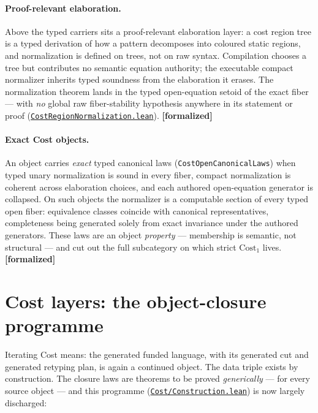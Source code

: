 \documentclass[11pt]{article}
\newcommand{\leanfile}[2]{\href{https://github.com/zariuq/MeTTapedia/blob/main/lean/mettapedia/Mettapedia/#1}{\code{#2}}}
\newcommand{\code}[1]{\texttt{#1}}
\newcommand{\formalized}{\textbf{[formalized]}}
\begin{document}
\paragraph{Proof-relevant elaboration.} Above the typed carriers sits a
proof-relevant elaboration layer: a cost region tree is a typed
derivation of how a pattern decomposes into coloured static regions, and
normalization is defined on trees, not on raw syntax.  Compilation
chooses a tree but contributes no semantic equation authority; the
executable compact normalizer inherits typed soundness from the
elaboration it erases.  The normalization theorem lands in the typed
open-equation setoid of the exact fiber --- with \emph{no} global raw
fiber-stability hypothesis anywhere in its statement or proof
(\leanfile{GSLT/LanguageDef/CostRegionNormalization.lean}{CostRegionNormalization.lean}).
\formalized

\paragraph{Exact Cost objects.} An object carries \emph{exact} typed
canonical laws (\code{CostOpenCanonicalLaws}) when typed unary
normalization is sound in every fiber, compact normalization is
coherent across elaboration choices, and each authored open-equation
generator is collapsed.  On such objects the normalizer is a computable
section of every typed open fiber: equivalence classes coincide with
canonical representatives, completeness being generated solely from
exact invariance under the authored generators.  These laws are an
object \emph{property} --- membership is semantic, not structural ---
and cut out the full subcategory on which strict $\mathrm{Cost}_1$
lives. \formalized

\section{Cost layers: the object-closure programme}
\label{sec:endofunctor}

Iterating Cost means: the generated funded language, with its generated
cut and generated retyping plan, is again a continued object.  The data
triple exists by construction.  The closure laws are theorems to be
proved \emph{generically} --- for every source object --- and this
programme
(\leanfile{GSLT/LanguageDef/Cost/Construction.lean}{Cost/Construction.lean})
is now largely discharged:
\end{document}
